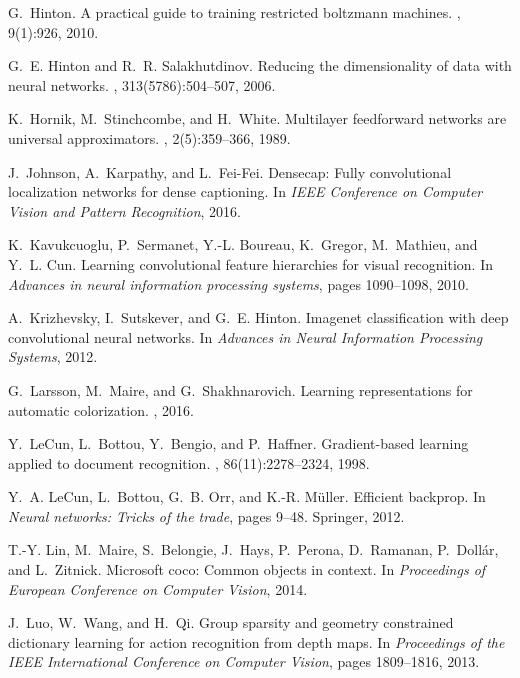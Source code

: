 \documentclass[10pt,twocolumn,letterpaper]{article}
\begin{document}
\begin{thebibliography}{10}
G.~Hinton.
\newblock A practical guide to training restricted boltzmann machines.
, 9(1):926, 2010.

G.~E. Hinton and R.~R. Salakhutdinov.
\newblock Reducing the dimensionality of data with neural networks.
, 313(5786):504--507, 2006.

K.~Hornik, M.~Stinchcombe, and H.~White.
\newblock Multilayer feedforward networks are universal approximators.
, 2(5):359--366, 1989.

J.~Johnson, A.~Karpathy, and L.~Fei-Fei.
\newblock Densecap: Fully convolutional localization networks for dense
  captioning.
\newblock In {\em IEEE Conference on Computer Vision and Pattern Recognition},
  2016.

K.~Kavukcuoglu, P.~Sermanet, Y.-L. Boureau, K.~Gregor, M.~Mathieu, and Y.~L.
  Cun.
\newblock Learning convolutional feature hierarchies for visual recognition.
\newblock In {\em Advances in neural information processing systems}, pages
  1090--1098, 2010.

A.~Krizhevsky, I.~Sutskever, and G.~E. Hinton.
\newblock Imagenet classification with deep convolutional neural networks.
\newblock In {\em Advances in Neural Information Processing Systems}, 2012.

G.~Larsson, M.~Maire, and G.~Shakhnarovich.
\newblock Learning representations for automatic colorization.
, 2016.

Y.~LeCun, L.~Bottou, Y.~Bengio, and P.~Haffner.
\newblock Gradient-based learning applied to document recognition.
, 86(11):2278--2324, 1998.

Y.~A. LeCun, L.~Bottou, G.~B. Orr, and K.-R. M{\"u}ller.
\newblock Efficient backprop.
\newblock In {\em Neural networks: Tricks of the trade}, pages 9--48. Springer,
  2012.

T.-Y. Lin, M.~Maire, S.~Belongie, J.~Hays, P.~Perona, D.~Ramanan,
  P.~Doll\'{a}r, and L.~Zitnick.
\newblock Microsoft coco: Common objects in context.
\newblock In {\em Proceedings of European Conference on Computer Vision}, 2014.

J.~Luo, W.~Wang, and H.~Qi.
\newblock Group sparsity and geometry constrained dictionary learning for
  action recognition from depth maps.
\newblock In {\em Proceedings of the IEEE International Conference on Computer
  Vision}, pages 1809--1816, 2013.


\end{thebibliography}
\end{document}
